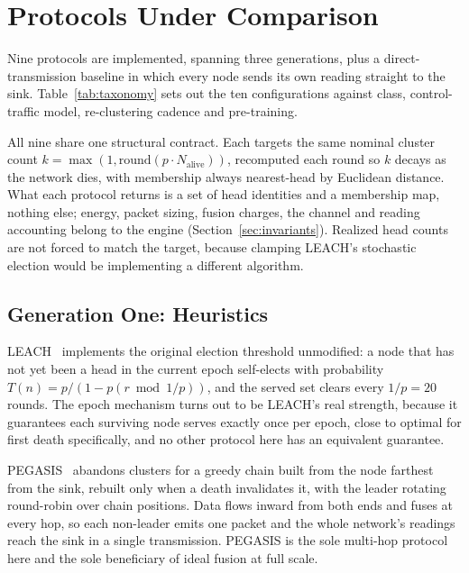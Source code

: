 \section{Protocols Under Comparison}
\label{sec:protocols}



Nine protocols are implemented, spanning three generations, plus a
direct-transmission baseline in which every node sends its own reading straight
to the sink. Table~\ref{tab:taxonomy} sets out the ten configurations against
class, control-traffic model, re-clustering cadence and pre-training.

All nine share one structural contract. Each targets the same nominal cluster
count $k = \max(1, \mathrm{round}(p \cdot N_{\mathrm{alive}}))$, recomputed each
round so $k$ decays as the network dies, with membership always nearest-head by
Euclidean distance. What each protocol returns is a set of head identities and a
membership map, nothing else; energy, packet sizing, fusion charges, the channel
and reading accounting belong to the engine (Section~\ref{sec:invariants}).
Realized head counts are not forced to match the target, because clamping
LEACH's stochastic election would be implementing a different algorithm.

\subsection{Generation One: Heuristics}

LEACH~\cite{heinzelman2000leach} implements the original election threshold
unmodified: a node that has not yet been a head in the current epoch self-elects
with probability $T(n) = p/(1 - p(r \bmod 1/p))$, and the served set clears
every $1/p = 20$ rounds. The epoch mechanism turns out to be LEACH's real
strength, because it guarantees each surviving node serves exactly once per
epoch, close to optimal for first death specifically, and no other protocol here
has an equivalent guarantee.

PEGASIS~\cite{lindsey2002pegasis} abandons clusters for a greedy chain built
from the node farthest from the sink, rebuilt only when a death invalidates it,
with the leader rotating round-robin over chain positions. Data flows inward
from both ends and fuses at every hop, so each non-leader emits one packet and
the whole network's readings reach the sink in a single transmission. PEGASIS is
the sole multi-hop protocol here and the sole beneficiary of ideal fusion at
full scale.

